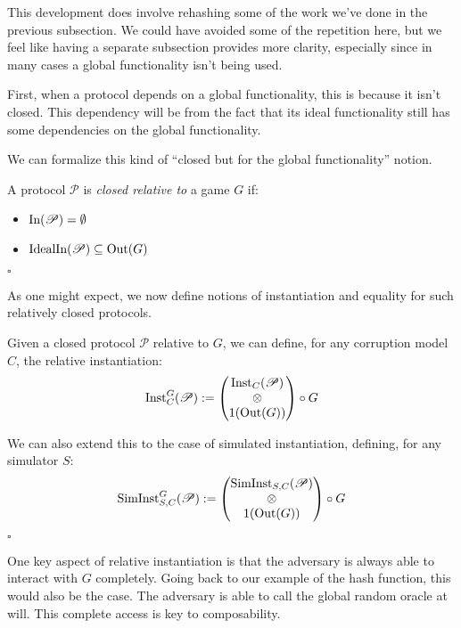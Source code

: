 This development does involve rehashing some of the work
we've done in the previous subsection.
We could have avoided some of the repetition here,
but we feel like having a separate subsection provides more clarity,
especially since in many cases a global functionality isn't being used.

First, when a protocol depends on a global functionality,
this is because it isn't closed.
This dependency will be from the fact that its ideal functionality
still has some dependencies on the global functionality.

We can formalize this kind of ``closed but for the global functionality''
notion.

\begin{definition}
  A protocol $\mathscr{P}$ is \emph{closed relative to} a game $G$
  if:
  \begin{itemize}
    \item $\text{In}(\mathscr{P}) = \emptyset$
    \item $\text{IdealIn}(\mathscr{P}) \subseteq \text{Out}(G)$
  \end{itemize} 

  $\square$
\end{definition}

As one might expect, we now define notions of instantiation
and equality for such relatively closed protocols.

\begin{definition}
  Given a closed protocol $\mathscr{P}$ relative to $G$, we can define,
  for any corruption model $C$,
  the relative instantiation:
  $$
  \text{Inst}_{C}^G(\mathscr{P}) :=
  \begin{pmatrix}
    \text{Inst}_C(\mathscr{P})\cr
    \otimes\cr
    1(\text{Out}(G))
  \end{pmatrix}
  \circ G
  $$

  We can also extend this to the case of simulated instantiation,
  defining, for any simulator $S$:
  $$
  \text{SimInst}_{S, C}^G(\mathscr{P}) :=
  \begin{pmatrix}
    \text{SimInst}_{S, C}(\mathscr{P})\cr
    \otimes\cr
    1(\text{Out}(G))
  \end{pmatrix}
  \circ G
  $$

  $\square$
\end{definition}

One key aspect of relative instantiation is that the adversary
is always able to interact with $G$ completely.
Going back to our example of the hash function,
this would also be the case.
The adversary is able to call the global random oracle at will.
This complete access is key to composability.

